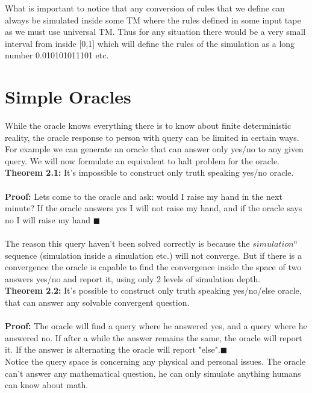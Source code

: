 \documentclass{article}
\begin{document}
What is important to notice that any conversion of rules that we define can always be simulated inside some TM where the rules defined in some input tape as we must use universal TM. Thus for any situation there would be a very small interval from inside [0,1] which will define the rules of the simulation as a long number 0.010101011101 etc. 

	\section{Simple Oracles}

While the oracle knows everything there is to know about finite deterministic reality, the oracle response to person with query can be limited in certain ways. For example we can generate an oracle that can answer only yes/no to any given query. We will now formulate an equivalent to halt problem for the oracle. \\

\textbf{Theorem 2.1:} It's impossible to construct only truth speaking yes/no oracle. \\\\
\textbf{Proof:} Lets come to the oracle and ask: would I raise my hand in the next minute? If the oracle answers yes I will not raise my hand, and if the oracle says no I will raise my hand $\blacksquare$ \\ \\

The reason this query haven't been solved correctly is because the $simulation^{n}$ sequence (simulation inside a simulation etc.) will not converge. But if there is a convergence the oracle is capable to find the convergence inside the space of two answers yes/no and report it, using only 2 levels of simulation depth. \\

\textbf{Theorem 2.2:} It's possible to construct only truth speaking yes/no/else oracle, that can answer any solvable convergent question. \\\\ 
\textbf{Proof:}
The oracle will find a query where he answered yes, and a query where he answered no. If after a while the answer remains the same, the oracle will report it. If the answer is alternating the oracle will report "else".$\blacksquare$\\ 

Notice the query space is concerning any physical and personal issues. The oracle can't answer any mathematical question, he can only simulate anything humans can know about math. \\
\end{document}
